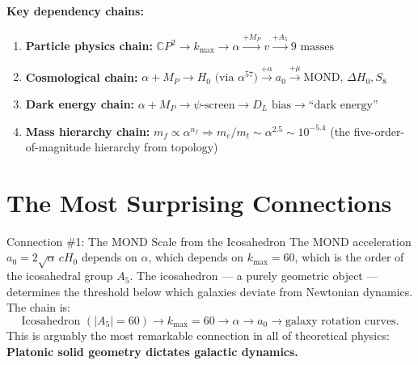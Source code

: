 \documentclass[12pt,a4paper]{article}
\newcommand{\CP}{\mathbb{C}P}
\begin{document}
\begin{center}
\end{center}

\paragraph{Key dependency chains:}

\begin{enumerate}[nosep]
\item \textbf{Particle physics chain:}
  $\CP^2 \to k_{\max} \to \alpha \xrightarrow{+M_P} v
  \xrightarrow{+A_5} \text{9 masses}$

\item \textbf{Cosmological chain:}
  $\alpha + M_P \to H_0 \text{ (via } \alpha^{57}\text{)}
  \xrightarrow{+\alpha} a_0 \xrightarrow{+\mu} \text{MOND, }
  \Delta H_0, S_8$

\item \textbf{Dark energy chain:}
  $\alpha + M_P \to \psi\text{-screen} \to D_L \text{ bias}
  \to \text{``dark energy''}$

\item \textbf{Mass hierarchy chain:}
  $m_f \propto \alpha^{n_f} \Rightarrow m_e/m_t \sim \alpha^{2.5}
  \sim 10^{-5.4}$ (the five-order-of-magnitude hierarchy from topology)
\end{enumerate}

\section{The Most Surprising Connections}
\label{sec:surprises}

\begin{surprisebox}{Connection \#1: The MOND Scale from the Icosahedron}
The MOND acceleration $a_0 = 2\sqrt{\alpha}\,cH_0$ depends on $\alpha$,
which depends on $k_{\max} = 60$, which is the order of the icosahedral
group $A_5$.  The icosahedron --- a purely geometric object --- determines
the threshold below which galaxies deviate from Newtonian dynamics.
The chain is:
\[
\text{Icosahedron } (|A_5| = 60) \to k_{\max} = 60 \to
\alpha \to a_0 \to \text{galaxy rotation curves.}
\]
This is arguably the most remarkable connection in all of theoretical
physics: \textbf{Platonic solid geometry dictates galactic dynamics.}
\end{surprisebox}
\end{document}
